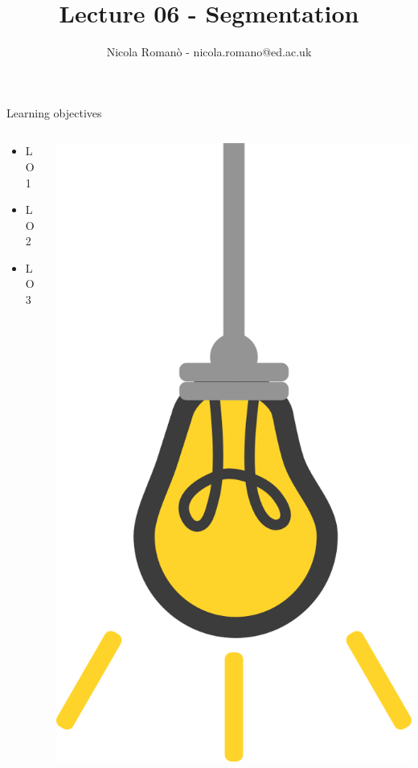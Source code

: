 \documentclass[9pt, aspectratio=169]{beamer}
\author{Nicola Roman\`o - nicola.romano@ed.ac.uk}
\title{Lecture 06 - Segmentation}
\date{}
\begin{document}

\begin{frame}
    \titlepage
\end{frame}

\begin{frame}
    {Learning objectives}
    \begin{columns}
        \begin{column}{0.8\textwidth}
            \begin{itemize}
                \item LO 1
                \item LO 2
                \item LO 3
            \end{itemize}
        \end{column}
        \begin{column}{0.2\textwidth}
            \includegraphics[angle=-30, origin=tr, width=1.5\textwidth]{lightbulb.png}

\end{column}
\end{columns}
\end{frame}
\end{document}

